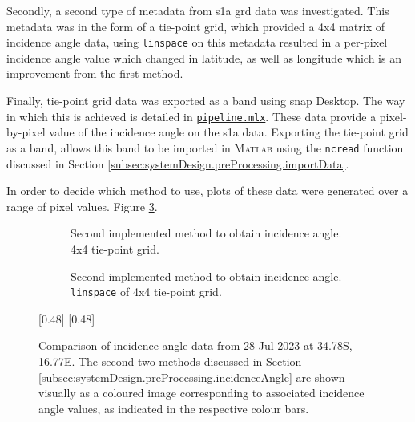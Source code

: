 Secondly, a second type of metadata from \acs{s1a} \acs{grd} data was investigated. This metadata was in the form of a tie-point grid, which provided a 4x4 matrix of incidence angle data, using \lstinline{linspace} on this metadata resulted in a per-pixel incidence angle value which changed in latitude, as well as longitude which is an improvement from the first method.

Finally, tie-point grid data was exported as a band using \acs{snap} Desktop. The way in which this is achieved is detailed in \href{https://github.com/JNSRYA006/sar-parameter-extraction-pipeline/blob/main/functions/[pipeline.mlx]}{\lstinline{pipeline.mlx}}. These data provide a pixel-by-pixel value of the incidence angle on the \acs{s1a} data. Exporting the tie-point grid as a band, allows this band to be imported in \textsc{Matlab} using the \lstinline{ncread} function discussed in Section \ref{subsec:systemDesign.preProcessing.importData}.

In order to decide which method to use, plots of these data were generated over a range of pixel values. Figure \ref{fig:systemDesign.preProcessing.incidence}.

\begin{figure}[H]
    \centering
    \begin{subfigure}{0.48\linewidth}
        \centering
        \resizebox{\linewidth}{!}{}
        \caption{Second implemented method to obtain incidence angle. 4x4 tie-point grid.}
        \label{fig:systemDesign.preProcessing.incidence.4_tie}
    \end{subfigure}   
    \begin{subfigure}{0.48\linewidth}
        \centering    
        \resizebox{\linewidth}{!}{}
        \caption{Second implemented method to obtain incidence angle. \lstinline{linspace} of 4x4 tie-point grid.}
        \label{fig:systemDesign.preProcessing.incidence.4_tie.linspace}        
    \end{subfigure}
    [0.48\linewidth]{
        \resizebox{\linewidth}{!}{}
    }
        [0.48\linewidth]{
        \resizebox{\linewidth}{!}{}
    }   
    \caption{Comparison of incidence angle data from 28-Jul-2023 at 34.78S, 16.77E. The second two methods discussed in Section \ref{subsec:systemDesign.preProcessing.incidenceAngle} are shown visually as a coloured image corresponding to associated incidence angle values, as indicated in the respective colour bars.}
    \label{fig:systemDesign.preProcessing.incidence}
\end{figure}

